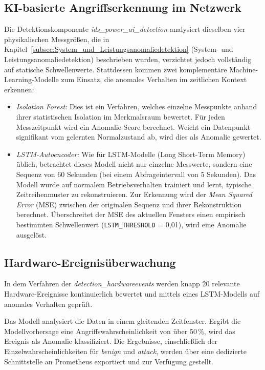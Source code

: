     \subsection{KI-basierte Angriffserkennung im Netzwerk}
    Die Detektionskomponente \textit{ids\_power\_ai\_detection} analysiert dieselben vier physikalischen Messgrößen, die in Kapitel~\ref{subsec:System_und_Leistungsanomaliedetektion} (System- und Leistungsanomaliedetektion) beschrieben wurden, verzichtet jedoch vollständig auf statische Schwellenwerte. Stattdessen kommen zwei komplementäre Machine-Learning-Modelle zum Einsatz, die anomales Verhalten im zeitlichen Kontext erkennen:

    \begin{itemize}
        \item \textit{Isolation Forest:} Dies ist ein Verfahren, welches einzelne Messpunkte anhand ihrer statistischen Isolation im Merkmalsraum bewertet. Für jeden Messzeitpunkt wird ein Anomalie-Score berechnet. Weicht ein Datenpunkt signifikant vom gelernten Normalzustand ab, wird dies als Anomalie gewertet.
        \item \textit{LSTM-Autoencoder:} Wie für LSTM-Modelle (Long Short-Term Memory) üblich, betrachtet dieses Modell nicht nur einzelne Messwerte, sondern eine Sequenz von 60 Sekunden (bei einem Abfrageintervall von 5 Sekunden). Das Modell wurde auf normalem Betriebsverhalten trainiert und lernt, typische Zeitreihenmuster zu rekonstruieren. Zur Erkennung wird der \textit{Mean Squared Error} (MSE) zwischen der originalen Sequenz und ihrer Rekonstruktion berechnet. Überschreitet der MSE des aktuellen Fensters einen empirisch bestimmten Schwellenwert (\texttt{LSTM\_THRESHOLD} = 0,01), wird eine Anomalie ausgelöst.
    \end{itemize}

    \subsection{Hardware-Ereignisüberwachung}
    In dem Verfahren der \textit{detection\_hardwareevents} werden knapp 20 relevante Hardware-Ereignisse kontinuierlich bewertet und mittels eines LSTM-Modells auf anomales Verhalten geprüft. 

    Das Modell analysiert die Daten in einem gleitenden Zeitfenster. Ergibt die Modellvorhersage eine Angriffswahrscheinlichkeit von über 50\,\%, wird das Ereignis als Anomalie klassifiziert. Die Ergebnisse, einschließlich der Einzelwahrscheinlichkeiten für \textit{benign} und \textit{attack}, werden über eine dedizierte Schnittstelle an Prometheus exportiert und zur Verfügung gestellt.